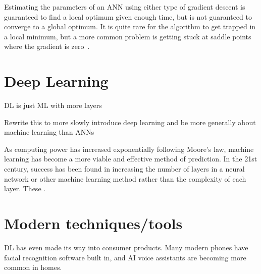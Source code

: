 
Estimating the parameters of an \ac{ANN} using either type of gradient descent is guaranteed to find a local optimum given enough time, but is not guaranteed to converge to a global optimum.
It is quite rare for the algorithm to get trapped in a local minimum, but a more common problem is getting stuck at saddle points where the gradient is zero~\autocite[438]{lecun2015}.

\section{Deep Learning} \label{ch:deep-learning}

\begin{todo}
	DL is just ML with more layers
\end{todo}

\begin{todo}
	Rewrite this to more slowly introduce deep learning and be more generally about machine learning than ANNs
\end{todo}
As computing power has increased exponentially following Moore's law, machine learning has become a more viable and effective method of prediction.
In the 21st century, success has been found in increasing the number of layers in a neural network or other machine learning method rather than the complexity of each layer.
These  .

\section{Modern techniques/tools}

\ac{DL} has even made its way into consumer products.
Many modern phones have facial recognition software built in, and \ac{AI} voice assistants are becoming more common in homes.

